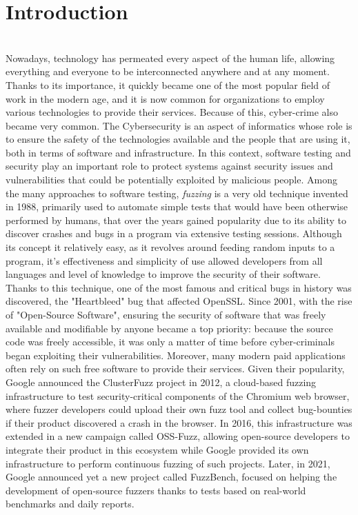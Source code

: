 \chapter{Introduction}
\ \\
Nowadays, technology has permeated every aspect of the human life, allowing everything and everyone to be interconnected anywhere and at any moment. Thanks to its importance, it quickly became one of the most popular field of work in the modern age, and it is now common for organizations to employ various technologies to provide their services. Because of this, cyber-crime also became very common.
\newline
The Cybersecurity is an aspect of informatics whose role is to ensure the safety of the technologies available and the people that are using it, both in terms of software and infrastructure. In this context, software testing and security play an important role to protect systems against security issues and vulnerabilities that could be potentially exploited by malicious people.
\newline \newline
Among the many approaches to software testing, \textit{fuzzing} is a very old technique invented in 1988, primarily used to automate simple tests that would have been otherwise performed by humans, that over the years gained popularity due to its ability to discover crashes and bugs in a program via extensive testing sessions. Although its concept it relatively easy, as it revolves around feeding random inputs to a program, it's effectiveness and simplicity of use allowed developers from all languages and level of knowledge to improve the security of their software.
\newline
Thanks to this technique, one of the most famous and critical bugs in history was discovered, the "Heartbleed" bug that affected OpenSSL.
\newline \newline
Since 2001, with the rise of "Open-Source Software", ensuring the security of software that was freely available and modifiable by anyone became a top priority: because the source code was freely accessible, it was only a matter of time before cyber-criminals began exploiting their vulnerabilities. Moreover, many modern paid applications often rely on such free software to provide their services. 
\newline
Given their popularity, Google announced the ClusterFuzz project in 2012, a cloud-based fuzzing infrastructure to test security-critical components of the Chromium web browser, where fuzzer developers could upload their own fuzz tool and collect bug-bounties if their product discovered a crash in the browser.
\newline
In 2016, this infrastructure was extended in a new campaign called OSS-Fuzz, allowing open-source developers to integrate their product in this ecosystem while Google provided its own infrastructure to perform continuous fuzzing of such projects.
\newline
Later, in 2021, Google announced yet a new project called FuzzBench, focused on helping the development of open-source fuzzers thanks to tests based on real-world benchmarks and daily reports. 




